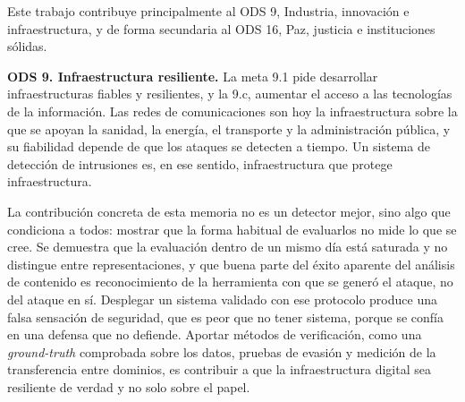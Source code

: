 %
%

Este trabajo contribuye principalmente al ODS 9, Industria, innovación e
infraestructura, y de forma secundaria al ODS 16, Paz, justicia e instituciones
sólidas.

\medskip

\noindent\textbf{ODS 9. Infraestructura resiliente.} La meta 9.1 pide
desarrollar infraestructuras fiables y resilientes, y la 9.c, aumentar el acceso
a las tecnologías de la información. Las redes de comunicaciones son hoy la
infraestructura sobre la que se apoyan la sanidad, la energía, el transporte y
la administración pública, y su fiabilidad depende de que los ataques se
detecten a tiempo. Un sistema de detección de intrusiones es, en ese sentido,
infraestructura que protege infraestructura.

La contribución concreta de esta memoria no es un detector mejor, sino algo que
condiciona a todos: mostrar que la forma habitual de evaluarlos no mide lo que
se cree. Se demuestra que la evaluación dentro de un mismo día está saturada y
no distingue entre representaciones, y que buena parte del éxito aparente del
análisis de contenido es reconocimiento de la herramienta con que se generó el
ataque, no del ataque en sí. Desplegar un sistema validado con ese protocolo
produce una falsa sensación de seguridad, que es peor que no tener sistema,
porque se confía en una defensa que no defiende. Aportar métodos de
verificación, como una \emph{ground-truth} comprobada sobre los datos, pruebas
de evasión y medición de la transferencia entre dominios, es contribuir a que la
infraestructura digital sea resiliente de verdad y no solo sobre el papel.

